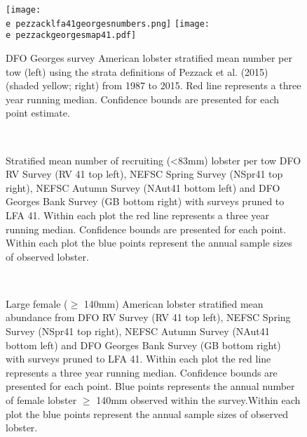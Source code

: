 \documentclass[11pt]{article}
\newcommand{\e}{/backup/bio_data/bio.lobster/figures/} %
\begin{document}
\begin{landscape}
\begin{figure}
\centering
    \texttt{[image: \\e pezzacklfa41georgesnumbers.png]} 
    \texttt{[image: \\e pezzackgeorgesmap41.pdf]} 
    
    \caption{DFO Georges survey American lobster stratified mean number per tow (left) using the strata definitions of Pezzack et al. (2015) (shaded yellow; right) from 1987 to 2015. Red line represents a three year running median. Confidence bounds are presented for each point estimate.}

\end{figure}
\end{landscape}


\begin{figure}
\centering
{}
\\

\caption{Stratified mean number of recruiting (\textless 83mm) lobster per tow DFO RV Survey (RV 41 top left), NEFSC Spring Survey (NSpr41 top right), NEFSC Autumn Survey (NAut41 bottom left) and DFO Georges Bank Survey (GB bottom right) with surveys pruned to LFA 41. Within each plot the red line represents a three year running median. Confidence bounds are presented for each point. Within each plot the blue points represent the annual sample sizes of observed lobster. }
\end{figure}
\clearpage





\begin{figure}
\centering
{}
\\

\caption{Large female ($\geq$ 140mm) American lobster stratified mean abundance from DFO RV Survey (RV 41 top left), NEFSC Spring Survey (NSpr41 top right), NEFSC Autumn Survey (NAut41 bottom left) and DFO Georges Bank Survey (GB bottom right) with surveys pruned to LFA 41. Within each plot the red line represents a three year running median. Confidence bounds are presented for each point.  Blue points represents the annual number of female lobster $\geq$ 140mm observed within the survey.Within each plot the blue points represent the annual sample sizes of observed lobster.}
\end{figure}
\clearpage
\end{document}

